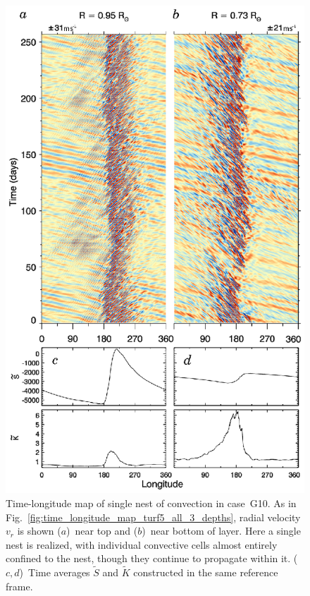 \begin{figure}
  \begin{center}
    \includegraphics[width=0.7\linewidth]{figs/chapter_4/Figure_16.eps}
  \end{center}
  \caption[Time-longitude map of single nest of convection in case~G10]
  {Time-longitude map of single nest of convection in case~G10.
    As in Fig.~\ref{fig:time_longitude_map_turf5_all_3_depths},
    radial velocity $v_r$ is shown ($a$)~near top and ($b$)~near bottom of layer.
    Here a single nest is realized, with individual
    convective cells almost entirely confined to the nest, though they
    continue to propagate within it.
    ($c,d$)~Time averages $\widetilde{S}$ and $\widetilde{K}$ constructed in the
    same reference frame.
  \label{fig:time_longitude_map_turf10_2_depths}}
\end{figure}
 

